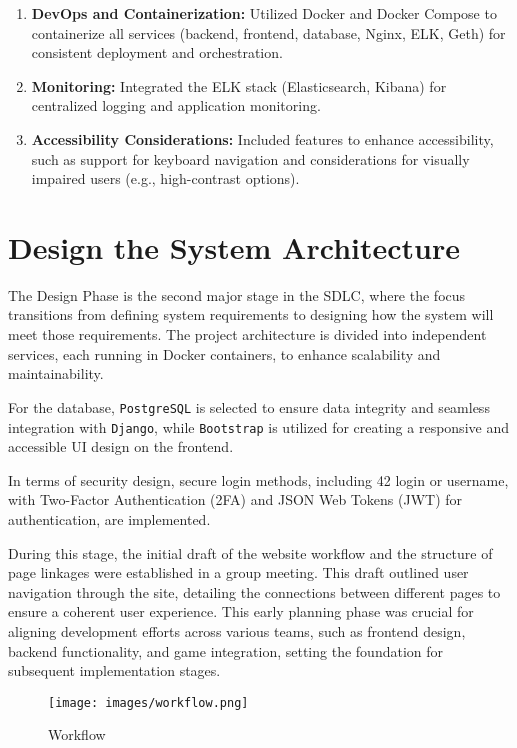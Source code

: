 \begin{enumerate}
    \item \textbf{DevOps and Containerization:} Utilized Docker and Docker Compose to containerize all services (backend, frontend, database, Nginx, ELK, Geth) for consistent deployment and orchestration.
    \item \textbf{Monitoring:} Integrated the ELK stack (Elasticsearch, Kibana) for centralized logging and application monitoring.
    \item \textbf{Accessibility Considerations:} Included features to enhance accessibility, such as support for keyboard navigation and considerations for visually impaired users (e.g., high-contrast options).
\end{enumerate}

\section{Design the System Architecture}
The Design Phase is the second major stage in the SDLC, where the focus transitions from defining system requirements to designing how the system will meet those requirements. The project architecture is divided into independent services, each running in Docker containers, to enhance scalability and maintainability.

For the database, \texttt{PostgreSQL} is selected to ensure data integrity and seamless integration with \texttt{Django}, while \texttt{Bootstrap} is utilized for creating a responsive and accessible UI design on the frontend.

In terms of security design, secure login methods, including 42 login or username, with Two-Factor Authentication (2FA) and JSON Web Tokens (JWT) for authentication, are implemented.

During this stage, the initial draft of the website workflow and the structure of page linkages were established in a group meeting. This draft outlined user navigation through the site, detailing the connections between different pages to ensure a coherent user experience. This early planning phase was crucial for aligning development efforts across various teams, such as frontend design, backend functionality, and game integration, setting the foundation for subsequent implementation stages.

\begin{figure}[H]
    \texttt{[image: images/workflow.png]}
    \caption{ Workflow }
    \label{fig:workflow}
\end{figure}


